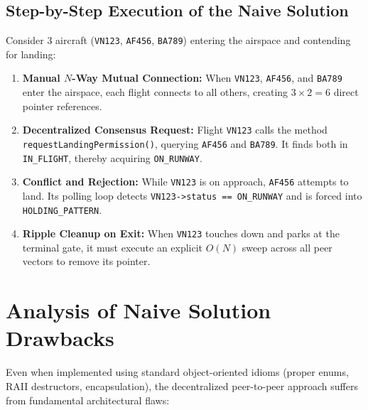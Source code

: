 \documentclass[12pt,a4paper]{article}
\begin{document}
\subsection{Step-by-Step Execution of the Naive Solution}
Consider 3 aircraft (\texttt{VN123}, \texttt{AF456}, \texttt{BA789}) entering the airspace and contending for landing:
\begin{enumerate}
    \item \textbf{Manual $N$-Way Mutual Connection:} When \texttt{VN123}, \texttt{AF456}, and \texttt{BA789} enter the airspace, each flight connects to all others, creating $3 \times 2 = 6$ direct pointer references.
    \item \textbf{Decentralized Consensus Request:} Flight \texttt{VN123} calls the method \texttt{requestLandingPermission()}, querying \texttt{AF456} and \texttt{BA789}. It finds both in \texttt{IN\_FLIGHT}, thereby acquiring \texttt{ON\_RUNWAY}.
    \item \textbf{Conflict and Rejection:} While \texttt{VN123} is on approach, \texttt{AF456} attempts to land. Its polling loop detects \texttt{VN123->status == ON\_RUNWAY} and is forced into \texttt{HOLDING\_PATTERN}.
    \item \textbf{Ripple Cleanup on Exit:} When \texttt{VN123} touches down and parks at the terminal gate, it must execute an explicit $O(N)$ sweep across all peer vectors to remove its pointer.
\end{enumerate}

\newpage
\section{Analysis of Naive Solution Drawbacks}

Even when implemented using standard object-oriented idioms (proper enums, RAII destructors, encapsulation), the decentralized peer-to-peer approach suffers from fundamental architectural flaws:
\end{document}

